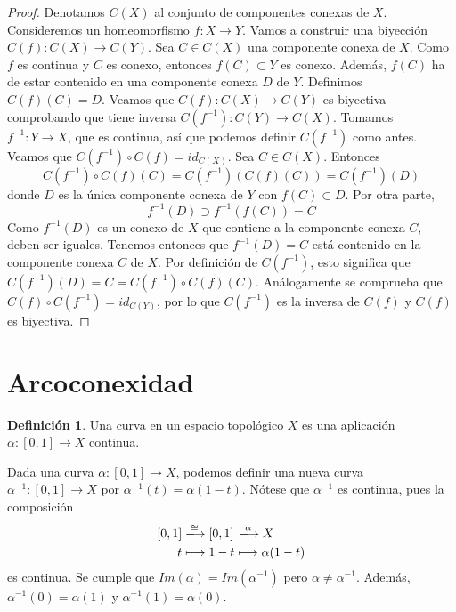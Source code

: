 \documentclass[12pt]{report}
\theoremstyle{definition}
\newtheorem{definition}{Definición}[chapter]
\theoremstyle{definition}
\theoremstyle{remark}
\begin{document}
\begin{proof}
Denotamos $C(X)$ al conjunto de componentes conexas de $X$. Consideremos un homeomorfismo $f \colon X \to Y$. Vamos a construir una biyección $C(f) \colon C(X) \to C(Y)$. Sea $C \in C(X)$ una componente conexa de $X$. Como $f$ es continua y $C$ es conexo, entonces $f(C) \subset Y$ es conexo. Además, $f(C)$ ha de estar contenido en una componente conexa $D$ de $Y$. Definimos $C(f)(C) = D$. Veamos que $C(f) \colon C(X) \to C(Y)$ es biyectiva comprobando que tiene inversa $C(f^{-1}) \colon C(Y) \to C(X)$. Tomamos $f^{-1} \colon Y \to X$, que es continua, así que podemos definir $C(f^{-1})$ como antes. Veamos que $C(f^{-1}) \circ C(f) = id_{C(X)}$. Sea $C \in C(X)$. Entonces
\[C(f^{-1}) \circ C(f)(C) = C(f^{-1})(C(f)(C)) = C(f^{-1})(D)\]
donde $D$ es la única componente conexa de $Y$ con $f(C) \subset D$. Por otra parte,
\[f^{-1}(D) \supset f^{-1}(f(C)) = C\]
Como $f^{-1}(D)$ es un conexo de $X$ que contiene a la componente conexa $C$, deben ser iguales. Tenemos entonces que $f^{-1}(D) = C$ está contenido en la componente conexa $C$ de $X$. Por definición de $C(f^{-1})$, esto significa que $C(f^{-1})(D) = C = C(f^{-1}) \circ C(f)(C)$. Análogamente se comprueba que $C(f) \circ C(f^{-1}) = id_{C(Y)}$, por lo que $C(f^{-1})$ es la inversa de $C(f)$ y $C(f)$ es biyectiva.
\end{proof}

\section{Arcoconexidad}

\begin{definition}
Una \underline{curva} en un espacio topológico $X$ es una aplicación $\alpha \colon [0,1] \to X$ continua.
\end{definition}

\vspace{2mm}
Dada una curva $\alpha \colon [0,1] \to X$, podemos definir una nueva curva $\alpha^{-1} \colon [0,1] \to X$ por $\alpha^{-1}(t) = \alpha(1-t)$. Nótese que $\alpha^{-1}$ es continua, pues la composición 
\[
\begin{aligned}[t]
    [0,1] & \xlongrightarrow{\cong} [0,1] \, \xlongrightarrow{\alpha} X \\
    t     & \longmapsto 1-t \longmapsto \alpha(1-t)
\end{aligned}
\] 
es continua. Se cumple que $Im(\alpha) = Im(\alpha^{-1})$ pero $\alpha \neq \alpha^{-1}$. Además, $\alpha^{-1}(0) = \alpha(1)$ y $\alpha^{-1}(1) = \alpha(0)$.
\end{document}
